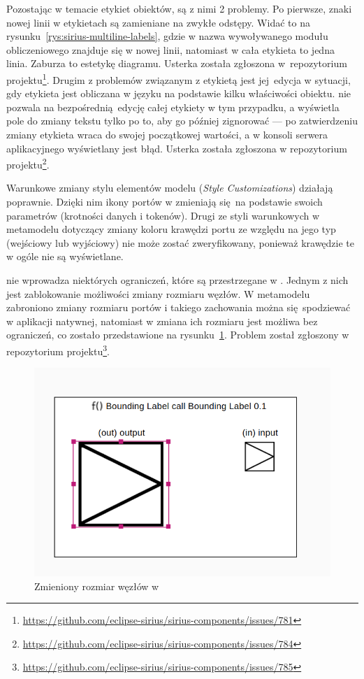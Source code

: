 Pozostając w temacie etykiet obiektów, są z nimi 2 problemy. Po pierwsze,
znaki nowej linii w etykietach są zamieniane na zwykłe odstępy. Widać to na
rysunku~\ref{rys:sirius-multiline-labels}, gdzie w \SiriusDesktop{} nazwa
wywoływanego modułu
obliczeniowego znajduje się w nowej linii, natomiast w \SiriusWeb{} cała
etykieta to jedna linia. Zaburza to estetykę diagramu. Usterka została
zgłoszona w~repozytorium projektu\footnote{
	\url{https://github.com/eclipse-sirius/sirius-components/issues/781}
}. Drugim z problemów związanym z etykietą jest jej~edycja w sytuacji, gdy
etykieta jest obliczana w języku \AQL{} na podstawie kilku właściwości
obiektu. \SiriusDesktop{} nie pozwala na bezpośrednią edycję całej
etykiety w tym przypadku, a \SiriusWeb{} wyświetla pole do zmiany tekstu
tylko po to, aby go później zignorować --- po zatwierdzeniu zmiany etykieta
wraca do swojej początkowej wartości, a w konsoli serwera aplikacyjnego
wyświetlany jest błąd. Usterka została zgłoszona w repozytorium
projektu\footnote{
	\url{https://github.com/eclipse-sirius/sirius-components/issues/784}
}.

Warunkowe zmiany stylu elementów modelu (\emph{Style Customizations}) działają
poprawnie. Dzięki nim ikony portów w \SiriusWeb{} zmieniają się na
podstawie swoich parametrów (krotności danych i tokenów). Drugi ze styli
warunkowych w metamodelu dotyczący zmiany koloru krawędzi portu ze względu na
jego typ (wejściowy lub wyjściowy) nie może zostać zweryfikowany, ponieważ
krawędzie te w ogóle nie są wyświetlane.

\SiriusWeb{} nie wprowadza niektórych ograniczeń, które są przestrzegane w
\SiriusDesktop{}. Jednym z nich jest zablokowanie możliwości zmiany
rozmiaru węzłów. W metamodelu zabroniono zmiany rozmiaru portów i takiego
zachowania można się spodziewać w aplikacji natywnej, natomiast w \SiriusWeb{}
zmiana ich rozmiaru jest możliwa bez ograniczeń, co zostało
przedstawione na
rysunku~\ref{rys:change-node-size}. Problem został zgłoszony w repozytorium
projektu\footnote{
	\url{https://github.com/eclipse-sirius/sirius-components/issues/785}}.

\begin{figure}[!hb]
  \centering

  \includegraphics[width=0.6\linewidth]{./images/change-node-size.png}
  \caption{Zmieniony rozmiar węzłów w \SiriusWeb{}}\label{rys:change-node-size}
\end{figure}

